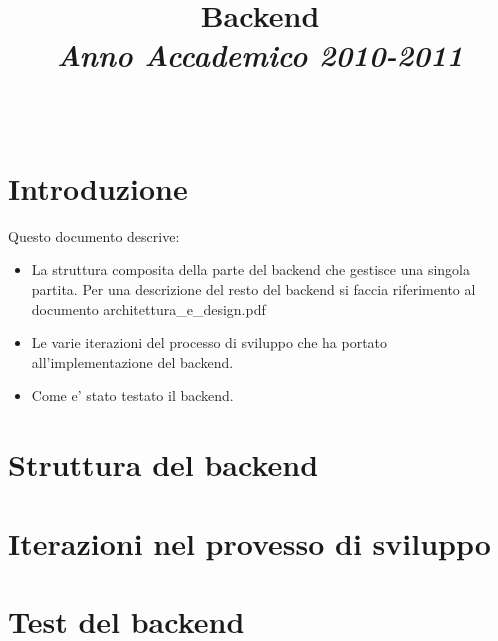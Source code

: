 \documentclass[10pt, draft]{book}
\title{Backend\\[2mm]{\small\emph{Anno Accademico 2010-2011}}\\[4mm]}
\author{\Nome\ \Cognome}
\begin{document}
\maketitle

\tableofcontents

\chapter{Introduzione}
Questo documento descrive:
\begin{itemize}
  \item 
    La struttura composita della parte del backend che gestisce una singola partita. Per una descrizione del resto del backend si faccia riferimento al documento architettura\_e\_design.pdf
  \item
    Le varie iterazioni del processo di sviluppo che ha portato all'implementazione del backend.
  \item
    Come e' stato testato il backend.
\end{itemize}


\chapter{Struttura del backend}
\chapter{Iterazioni nel provesso di sviluppo}
\chapter{Test del backend}

\printindex
\end{document}
